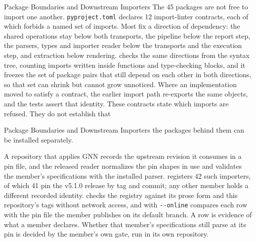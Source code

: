\documentclass[
  ignorenonframetext,
]{beamer}
\begin{document}
\begin{frame}{Package Boundaries and
Downstream Importers}
\protect{}\label{package-boundaries-and-downstream-importers}
The 45 packages are not free to import one another.
\texttt{pyproject.toml} declares 12 import-linter contracts, each of
which forbids a named set of imports. Most fix a direction of
dependency: the shared operations stay below both transports, the
pipeline below the report step, the parsers, types and importer reader
below the transports and the execution step, and extraction below
rendering. 
checks the same directions from the syntax tree, counting imports
written inside functions and type-checking blocks, and it freezes the
set of package pairs that still depend on each other in both directions,
so that set can shrink but cannot grow unnoticed. Where an
implementation moved to satisfy a contract, the earlier import path
re-exports the same objects, and the tests assert that identity. These
contracts state which imports are refused. They do not establish that
\end{frame}

\begin{frame}{Package Boundaries and
Downstream Importers}
the packages behind them can be installed separately.

A repository that applies GNN records the upstream revision it consumes
in a pin file, and the released reader 
normalizes the pin shapes in use and validates the member's
specifications with the installed parser.
 registers 42 such importers, of
which 41 pin the v5.1.0 release by tag and commit; any other member
holds a different recorded identity.
 checks the registry
against its prose form and this repository's tags without network
access, and with \texttt{-\/-online} compares each row with the pin file
the member publishes on its default branch. A row is evidence of what a
member declares. Whether that member's specifications still parse at its
pin is decided by the member's own gate, run in its own repository.
\end{frame}
\end{document}
